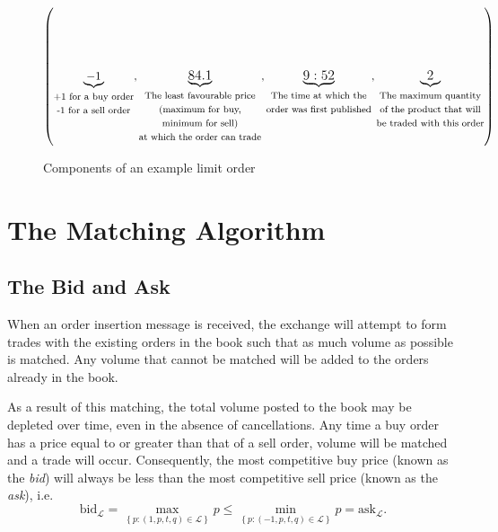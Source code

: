 \documentclass[honours,12pt]{unswthesis}
\numberwithin{equation}{section}
\begin{document}
\begin{figure}[h]
	$$\left(\underbrace{-1}_{\fontsize{8}{8}\begin{matrix} \text{+1 for a buy order}\\ \text{-1 for a sell order}\end{matrix}}\fontsize{12}{8},\underbrace{84.1}_{\fontsize{8}{8}\begin{matrix}\text{The least favourable price}\\\text{(maximum for buy,}\\\text{minimum for sell)}\\\text{at which the order can trade}\end{matrix}}\fontsize{12}{8},\underbrace{9:52}_{\fontsize{8}{8}\begin{matrix}\text{The time at which the}\\\text{order was first published}\end{matrix}}\fontsize{12}{8},\underbrace{2}_{\fontsize{8}{8}\begin{matrix}\text{The maximum quantity}\\\text{of the product that will}\\\text{be traded with this order}\end{matrix}}\right)$$
	\caption{Components of an example limit order}
	\label{fig:limitorder}
\end{figure}

\newpage
\section{The Matching Algorithm}
\subsection{The Bid and Ask}
When an order insertion message is received, the exchange will attempt to form trades with the existing orders in the book such that as much volume as possible is matched. Any volume that cannot be matched will be added to the orders already in the book.

As a result of this matching, the total volume posted to the book may be depleted over time, even in the absence of cancellations. Any time a buy order has a price equal to or greater than that of a sell order, volume will be matched and a trade will occur. Consequently, the most competitive buy price (known as the \textit{bid}) will always be less than the most competitive sell price (known as the \textit{ask}), i.e.
	$$\text{bid}_\mathcal{L} = \max_{\left\{p : (1,p,t,q)\in\mathcal{L}\right\}} p \leq \min_{\left\{p : (-1,p,t,q)\in\mathcal{L}\right\}} p = \text{ask}_\mathcal{L}.$$
\end{document}
